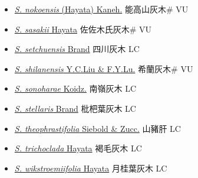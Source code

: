 \begin{itemize}
\begin{itemize}
        \item[] \href{http://www.theplantlist.org/tpl1.1/search?q=Symplocos+nokoensis}{\textit{S. nokoensis} (Hayata) Kaneh.}   能高山灰木\# VU
        \item[] \href{http://www.theplantlist.org/tpl1.1/search?q=Symplocos+sasakii}{\textit{S. sasakii} Hayata}   佐佐木氏灰木\# VU
        \item[] \href{http://www.theplantlist.org/tpl1.1/search?q=Symplocos+setchuensis}{\textit{S. setchuensis} Brand}   四川灰木 LC
        \item[] \href{http://www.theplantlist.org/tpl1.1/search?q=Symplocos+shilanensis}{\textit{S. shilanensis} Y.C.Liu \& F.Y.Lu.}   希蘭灰木\# VU
        \item[] \href{http://www.theplantlist.org/tpl1.1/search?q=Symplocos+sonoharae}{\textit{S. sonoharae} Koidz.}   南嶺灰木 LC
        \item[] \href{http://www.theplantlist.org/tpl1.1/search?q=Symplocos+stellaris}{\textit{S. stellaris} Brand}   枇杷葉灰木 LC
        \item[] \href{http://www.theplantlist.org/tpl1.1/search?q=Symplocos+theophrastifolia}{\textit{S. theophrastifolia} Siebold \& Zucc.}   山豬肝 LC
        \item[] \href{http://www.theplantlist.org/tpl1.1/search?q=Symplocos+trichoclada}{\textit{S. trichoclada} Hayata}   褐毛灰木 LC
        \item[] \href{http://www.theplantlist.org/tpl1.1/search?q=Symplocos+wikstroemiifolia}{\textit{S. wikstroemiifolia} Hayata}   月桂葉灰木 LC
  \end{itemize}
  \end{itemize}
